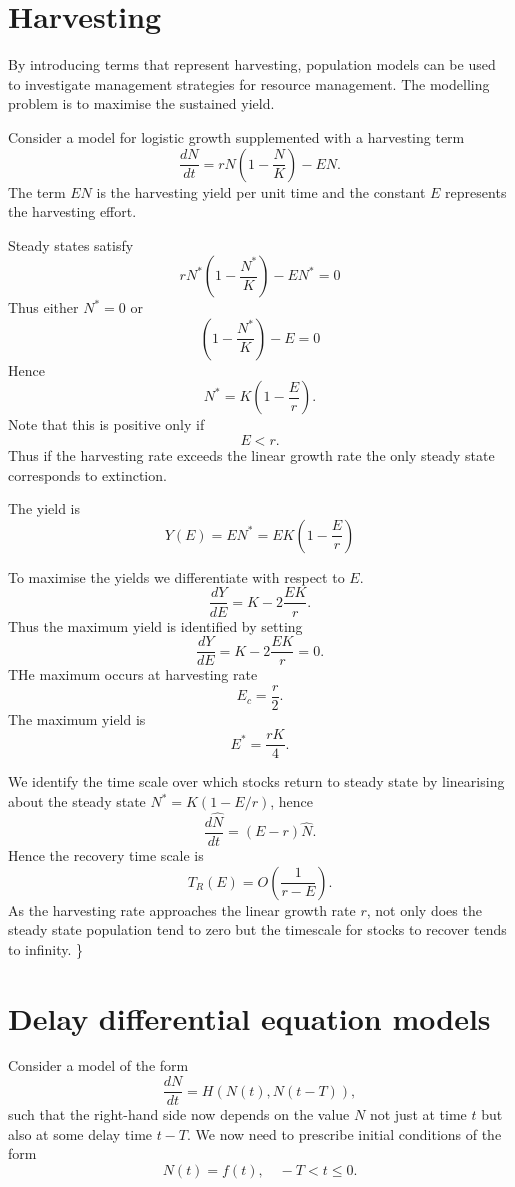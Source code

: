 \documentclass[
  letterpaper,
  DIV=11,
  numbers=noendperiod]{scrreprt}
\begin{document}
\hypertarget{harvesting}{%
\section{Harvesting}\label{harvesting}}

By introducing terms that represent harvesting, population models can be
used to investigate management strategies for resource management. The
modelling problem is to maximise the sustained yield.

Consider a model for logistic growth supplemented with a harvesting term
\[
\frac{dN}{dt}=rN\left(1-\frac{N}{K}\right) -EN.
\] The term \(EN\) is the harvesting yield per unit time and the
constant \(E\) represents the harvesting effort.

Steady states satisfy \[
rN^*\left(1-\frac{N^*}{K}\right) -EN^*=0
\] Thus either \(N^*=0\) or \[
\left(1-\frac{N^*}{K}\right) -E=0
\] Hence \[
N^*=K(1-\frac{E}{r}).
\] Note that this is positive only if \[
E<r.
\] Thus if the harvesting rate exceeds the linear growth rate the only
steady state corresponds to extinction.

The yield is \[
Y(E)=EN^*=EK(1-\frac{E}{r})
\]

To maximise the yields we differentiate with respect to \(E\). \[
\frac{dY}{dE} = K - 2\frac{EK}{r}.
\] Thus the maximum yield is identified by setting \[
\frac{dY}{dE} = K - 2\frac{EK}{r}=0.
\] THe maximum occurs at harvesting rate \[
E_c=\frac{r}{2}.
\] The maximum yield is \[
E^*=\frac{rK}{4}.
\]

We identify the time scale over which stocks return to steady state by
linearising about the steady state \(N^*=K(1-E/r)\), hence \[
\frac{d \hat{N}}{dt} = (E-r)\hat{N}.
\] Hence the recovery time scale is \[
T_R(E)=O(\frac{1}{r-E}).
\] As the harvesting rate approaches the linear growth rate \(r\), not
only does the steady state population tend to zero but the timescale for
stocks to recover tends to infinity. \}

\hypertarget{delay-differential-equation-models}{%
\section{Delay differential equation
models}\label{delay-differential-equation-models}}

Consider a model of the form \[
\frac{dN}{dt}=H(N(t),N(t-T)),
\] such that the right-hand side now depends on the value \(N\) not just
at time \(t\) but also at some delay time \(t-T\). We now need to
prescribe initial conditions of the form \[
N(t)=f(t), \quad -T<t\leq0.
\]
\end{document}
